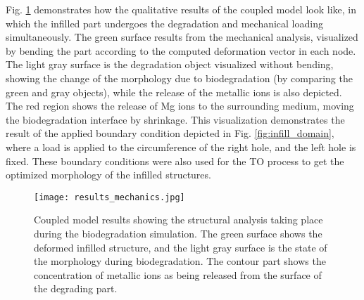 Fig. \ref{fig:infill_results_mechanics} demonstrates how the qualitative results of the coupled model look like, in which the infilled part undergoes the degradation and mechanical loading simultaneously. The green surface results from the mechanical analysis, visualized by bending the part according to the computed deformation vector in each node. The light gray surface is the degradation object visualized without bending, showing the change of the morphology due to biodegradation (by comparing the green and gray objects), while the release of the metallic ions is also depicted. The red region shows the release of Mg ions to the surrounding medium, moving the biodegradation interface by shrinkage. This visualization demonstrates the result of the applied boundary condition depicted in Fig. \ref{fig:infill_domain}, where a load is applied to the circumference of the right hole, and the left hole is fixed. These boundary conditions were also used for the \gls{TO} process to get the optimized morphology of the infilled structures.


\begin{figure}[h]
\centering
\medskip
\texttt{[image: results\_mechanics.jpg]}
\caption[Coupled model results showing the structural analysis taking place during biodegradation simulation]{Coupled model results showing the structural analysis taking place during the biodegradation simulation. The green surface shows the deformed infilled structure, and the light gray surface is the state of the morphology during biodegradation. The contour part shows the concentration of metallic ions as being released from the surface of the degrading part.} \label{fig:infill_results_mechanics}
\end{figure}

